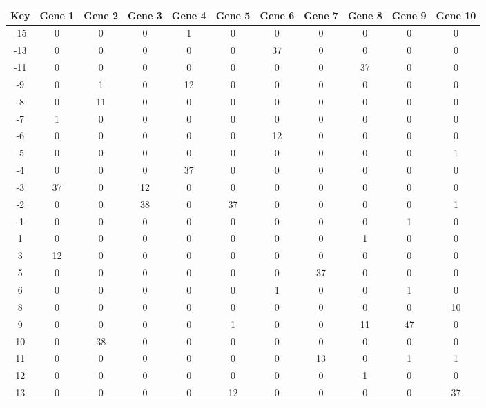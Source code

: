 \begin{tabular}{|c|c|c|c|c|c|c|c|c|c|c|}
\hline
Key & Gene 1 & Gene 2 & Gene 3 & Gene 4 & Gene 5 & Gene 6 & Gene 7 & Gene 8 & Gene 9 & Gene 10 \\
\hline
-15 & 0 & 0 & 0 & 1 & 0 & 0 & 0 & 0 & 0 & 0 \\
-13 & 0 & 0 & 0 & 0 & 0 & 37 & 0 & 0 & 0 & 0 \\
-11 & 0 & 0 & 0 & 0 & 0 & 0 & 0 & 37 & 0 & 0 \\
-9 & 0 & 1 & 0 & 12 & 0 & 0 & 0 & 0 & 0 & 0 \\
-8 & 0 & 11 & 0 & 0 & 0 & 0 & 0 & 0 & 0 & 0 \\
-7 & 1 & 0 & 0 & 0 & 0 & 0 & 0 & 0 & 0 & 0 \\
-6 & 0 & 0 & 0 & 0 & 0 & 12 & 0 & 0 & 0 & 0 \\
-5 & 0 & 0 & 0 & 0 & 0 & 0 & 0 & 0 & 0 & 1 \\
-4 & 0 & 0 & 0 & 37 & 0 & 0 & 0 & 0 & 0 & 0 \\
-3 & 37 & 0 & 12 & 0 & 0 & 0 & 0 & 0 & 0 & 0 \\
-2 & 0 & 0 & 38 & 0 & 37 & 0 & 0 & 0 & 0 & 1 \\
-1 & 0 & 0 & 0 & 0 & 0 & 0 & 0 & 0 & 1 & 0 \\
1 & 0 & 0 & 0 & 0 & 0 & 0 & 0 & 1 & 0 & 0 \\
3 & 12 & 0 & 0 & 0 & 0 & 0 & 0 & 0 & 0 & 0 \\
5 & 0 & 0 & 0 & 0 & 0 & 0 & 37 & 0 & 0 & 0 \\
6 & 0 & 0 & 0 & 0 & 0 & 1 & 0 & 0 & 1 & 0 \\
8 & 0 & 0 & 0 & 0 & 0 & 0 & 0 & 0 & 0 & 10 \\
9 & 0 & 0 & 0 & 0 & 1 & 0 & 0 & 11 & 47 & 0 \\
10 & 0 & 38 & 0 & 0 & 0 & 0 & 0 & 0 & 0 & 0 \\
11 & 0 & 0 & 0 & 0 & 0 & 0 & 13 & 0 & 1 & 1 \\
12 & 0 & 0 & 0 & 0 & 0 & 0 & 0 & 1 & 0 & 0 \\
13 & 0 & 0 & 0 & 0 & 12 & 0 & 0 & 0 & 0 & 37 \\
\hline
\end{tabular}